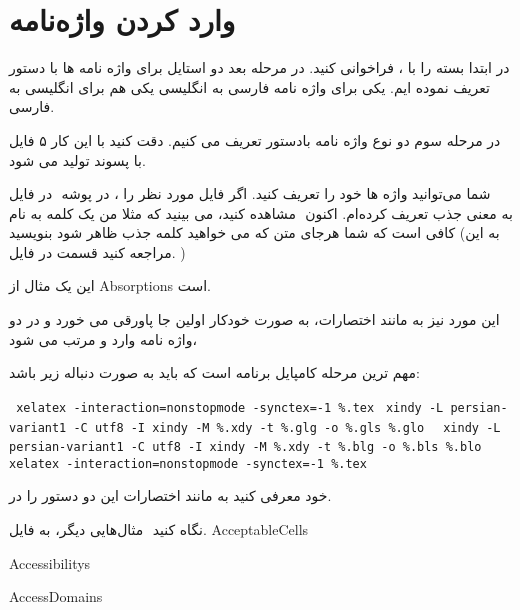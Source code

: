 \chapter{وارد کردن واژه‌نامه}

در ابتدا بسته {} را با {}، {} فراخوانی کنید. در مرحله بعد دو استایل برای واژه نامه ها با دستور {} تعریف نموده ایم. یکی برای واژه نامه فارسی به انگلیسی یکی هم برای انگلیسی به فارسی. 

در مرحله سوم دو نوع واژه نامه بادستور {} تعریف می کنیم. دقت کنید با این کار ۵ فایل با پسوند {} تولید می شود.

در فایل ‎‎ در پوشه ‎‎، شما می‌توانید واژه ها خود را تعریف کنید. اگر فایل مورد نظر را مشاهده کنید، می بینید که مثلا من یک کلمه به نام ‎‎ به معنی جذب تعریف کرده‌ام. اکنون کافی است که شما هرجای متن که می خواهید کلمه جذب ظاهر شود بنویسید (به این قسمت در فایل ‎‎مراجعه کنید. )

این یک مثال از \glspl{Absorption} است.

این مورد نیز به مانند اختصارات، به صورت خودکار اولین جا پاورقی می خورد و در دو واژه نامه وارد و مرتب می شود، 


مهم ترین مرحله کامپایل برنامه است که باید به صورت دنباله زیر باشد:
\begin{itemize}
\begin{LTRitems}
\hand
\verb+ xelatex -interaction=nonstopmode -synctex=-1 %.tex+
\hand
\verb+ xindy -L persian-variant1 -C utf8 -I xindy -M %.xdy -t %.glg -o %.gls %.glo +
\hand
\verb+ xindy -L persian-variant1 -C utf8 -I xindy -M %.xdy -t %.blg -o %.bls %.blo +
\hand
\verb+ xelatex -interaction=nonstopmode -synctex=-1 %.tex+
\end{LTRitems}
\end{itemize}
به مانند اختصارات این دو دستور را در ‎‎‌خود معرفی کنید. 

مثال‌هایی دیگر، به فایل ‎‎ نگاه کنید. 
\glspl{AcceptableCell}

\glspl{Accessibility}

\glspl{AccessDomain}








